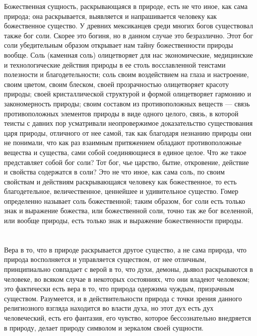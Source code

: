\documentclass[12pt,oneside]{book}
\begin{document}
Божественная сущность, раскрывающаяся в природе, есть не что иное, как сама природа; она раскрывается, выявляется и напрашивается человеку как божественное существо. У древних мексиканцев среди многих богов существовал также бог соли. Скорее это богиня, но в данном случае это безразлично. Этот бог соли убедительным образом открывает нам тайну божественности природы вообще. Соль (каменная соль) олицетворяет для нас экономические, медицинские и технологические действия природы в ее столь восславленной теистами полезности и благодетельности; соль своим воздействием на глаза и настроение, своим цветом, своим блеском, своей прозрачностью олицетворяет красоту природы; своей кристаллической структурой и формой олицетворяет гармонию и закономерность природы; своим составом из противоположных веществ --- связь противоположных элементов природы в виде одного целого, связь, в которой теисты с давних пор усматривали неопровержимое доказательство существования царя природы, отличного от нее самой, так как благодаря незнанию природы они не понимали, что как раз взаимным притяжением обладают противоположные вещества и существа, сами собой соединяющиеся в единое целое. Что же такое представляет собой бог соли? Тот бог, чье царство, бытие, откровение, действие и свойства содержатся в соли? Это не что иное, как сама соль, по своим свойствам и действиям раскрывающаяся человеку как божественное, то есть благодетельное, величественное, ценнейшее и удивительное существо. Гомер определенно называет соль божественной; таким образом, бог соли есть только знак и выражение божества, или божественной соли, точно так же бог вселенной, или вообще природы, есть только знак и выражение божественности природы.



\chapter{}

Вера в то, что в природе раскрывается другое существо, а не сама природа, что природа восполняется и управляется существом, от нее отличным, принципиально совпадает с верой в то, что духи, демоны, дьявол раскрываются в человеке, во всяком случае в некоторых состояниях, что они владеют человеком; это фактически есть вера в то, что природа одержима чуждым, призрачным существом. Разумеется, и в действительности природа с точки зрения данного религиозного взгляда находится во власти духа, но этот дух есть дух человеческий, есть его фантазия, его чувство, которое бессознательно внедряется в природу, делает природу символом и зеркалом своей сущности.
\end{document}
